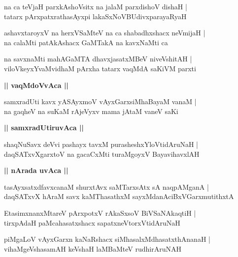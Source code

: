 \documentclass[twoside,12pt,openright]{book}
\newcounter{shloka}[chapter]
\def\uvaca#1{\centerline{{\large\textbf{#1}}}}
\begin{document}
\begin{shloka}%
na ca teVjaH parxkAshoVsitx na jalaM parxdishoV dishaH |\\
tatarx pArxpatxrathasAyxpi lakaSxNoVBUdivxparayaRyaH 
\end{shloka}

\begin{shloka}%
ashavxtaroyxV na herxVSaMteV na  ca shabadhxshacx neVmijaH |\\
na calaMti patAkAshacx GaMTakA na kavxNaMti ca 
\end{shloka}

\begin{shloka}%
na savxnaMti mahAGaMTA dhavxjasatxMBeV niveVshitAH |\\
viloVkeyxYvaMvidhaM pArxha tatarx vaqMdA saKiVM parxti
\end{shloka}

\uvaca{|| vaqMdoVvAca ||}

\begin{shloka}%
samxradUti kavx yASAyxmoV vAyxGarxsiMhaBayaM vanaM |\\
na gaqheV na suKaM rAjeVyxv mama jAtaM vaneV saKi
\end{shloka}

\uvaca{|| samxradUtiruvAca ||}

\begin{shloka}%
shaqNuSavx deVvi pashayx tavxM purasheshxYloVtidAruNaH |\\
daqSATxvXgarxtoV na gacaCxMti turaMgoyxV BayavihavxlAH 
\end{shloka}

\uvaca{|| nArada uvAca ||}

\begin{shloka}%
tasAyxsatxdfavxcanaM shurxtAvx saMTarxsAtx sA naqpAMganA |\\
daqSATxvX hAraM savx kaMThasathxM sayxMdanAciBxVGarxmutithxtA 
\end{shloka}

\begin{shloka}%
EtasimxnanxMtareV pArxpotxV rAkaSxsoV BiVSaNAkaqtiH |\\
tirxpAdaH paMcahasatxshacx sapatxneVtorxVtidAruNaH  
\end{shloka}

\begin{shloka}%
piMgaLoV vAyxGarxn kaNaRshacx siMhasalxMdhasatxthAnanaH |\\
vihaMgeVshasamAH keVshaH laMBaMteV rudhirAruNAH 
\end{shloka}
\end{document}
